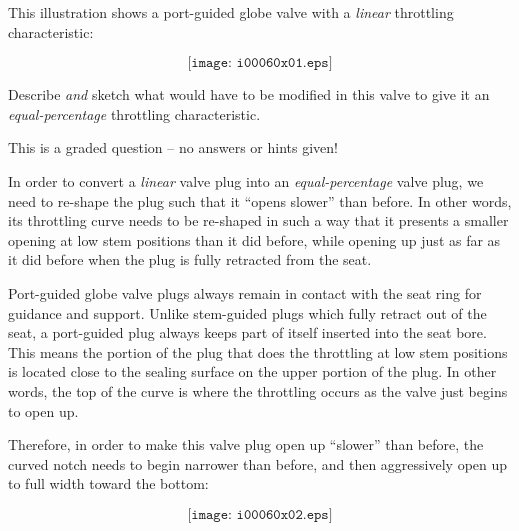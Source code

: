 

This illustration shows a port-guided globe valve with a {\it linear} throttling characteristic:

$$\texttt{[image: i00060x01.eps]}$$

Describe {\it and} sketch what would have to be modified in this valve to give it an {\it equal-percentage} throttling characteristic.

\vfil

\eject






This is a graded question -- no answers or hints given!







In order to convert a {\it linear} valve plug into an {\it equal-percentage} valve plug, we need to re-shape the plug such that it ``opens slower'' than before.  In other words, its throttling curve needs to be re-shaped in such a way that it presents a smaller opening at low stem positions than it did before, while opening up just as far as it did before when the plug is fully retracted from the seat.

Port-guided globe valve plugs always remain in contact with the seat ring for guidance and support.  Unlike stem-guided plugs which fully retract out of the seat, a port-guided plug always keeps part of itself inserted into the seat bore.  This means the portion of the plug that does the throttling at low stem positions is located close to the sealing surface on the upper portion of the plug.  In other words, the top of the curve is where the throttling occurs as the valve just begins to open up.

Therefore, in order to make this valve plug open up ``slower'' than before, the curved notch needs to begin narrower than before, and then aggressively open up to full width toward the bottom:

$$\texttt{[image: i00060x02.eps]}$$







